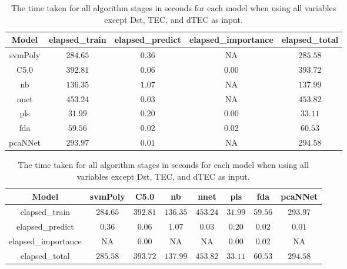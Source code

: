 \begin{table}[!ht]
	\centering
	\begin{tabular}{|c|c|c|c|c|}
		\hline
		Model & elapsed_train & elapsed_predict & elapsed_importance & elapsed_total \\ \hline
		svmPoly & $284.65$ & $0.36$ & NA & $285.58$ \\ \hline
		C5.0 & $392.81$ & $0.06$ & $0.00$ & $393.72$ \\ \hline
		nb & $136.35$ & $1.07$ & NA & $137.99$ \\ \hline
		nnet & $453.24$ & $0.03$ & NA & $453.82$ \\ \hline
		pls & $31.99$ & $0.20$ & $0.00$ & $33.11$ \\ \hline
		fda & $59.56$ & $0.02$ & $0.02$ & $60.53$ \\ \hline
		pcaNNet & $293.97$ & $0.01$ & NA & $294.58$ \\ \hline
	\end{tabular}
	\caption{The time taken for all algorithm stages in seconds for each model when using all variables except Dst, TEC, and dTEC as input.}
	\label{tab:time:noTEC}
\end{table}

\begin{table}[!ht]
	\centering
	\begin{tabular}{|c|c|c|c|c|c|c|c|}
		\hline
		Model & svmPoly & C5.0 & nb & nnet & pls & fda & pcaNNet \\ \hline
		elapsed_train & $284.65$ & $392.81$ & $136.35$ & $453.24$ & $31.99$ & $59.56$ & $293.97$ \\ \hline
		elapsed_predict & $0.36$ & $0.06$ & $1.07$ & $0.03$ & $0.20$ & $0.02$ & $0.01$ \\ \hline
		elapsed_importance & NA & $0.00$ & NA & NA & $0.00$ & $0.02$ & NA \\ \hline
		elapsed_total & $285.58$ & $393.72$ & $137.99$ & $453.82$ & $33.11$ & $60.53$ & $294.58$ \\ \hline
	\end{tabular}
	\caption{The time taken for all algorithm stages in seconds for each model when using all variables except Dst, TEC, and dTEC as input.}
	\label{tab:time:reverse:noTEC}
\end{table}

